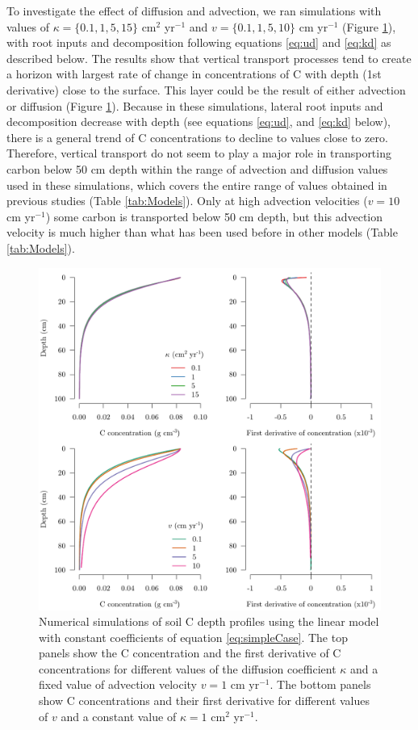 \documentclass[11pt, oneside, a4paper]{article}   	%
\begin{document}
To investigate the effect of diffusion and advection, we ran simulations with values of $\kappa = \{0.1, 1, 5, 15\}$ cm$^2$ yr$^{-1}$ and $v = \{0.1, 1, 5, 10 \}$ cm yr$^{-1}$  (Figure \ref{fig:AdvectionDiffusion}), with root inputs and decomposition following equations \ref{eq:ud} and \ref{eq:kd} as described below. The results show that vertical transport processes tend to create a horizon with largest rate of change in concentrations of C with depth (1st derivative) close to the surface. This layer could be the result of either advection or diffusion (Figure \ref{fig:AdvectionDiffusion}). Because in these simulations, lateral root inputs and decomposition decrease with depth (see equations \ref{eq:ud}, and \ref{eq:kd} below), there is a general trend of C concentrations to decline to values close to zero. Therefore, vertical transport do not seem to play a major role in transporting carbon below 50 cm depth within the range of advection and diffusion values used in these simulations, which covers the entire range of values obtained in previous studies (Table \ref{tab:Models}). Only at high advection velocities ($v=10$ cm yr$^{-1}$) some carbon is transported below 50 cm depth, but this advection velocity is much higher than what has been used before in other models (Table \ref{tab:Models}).

\begin{figure}[htbp]
   \centering
   \includegraphics[width=\textwidth]{Figures/simulationsKappaV.pdf} %
   \caption{Numerical simulations of soil C depth profiles using the linear model with constant coefficients of equation \ref{eq:simpleCase}. The top panels show the C concentration and the first derivative of C concentrations for different values of the diffusion coefficient $\kappa$ and a fixed value of advection velocity $v = 1$ cm yr$^{-1}$. The bottom panels show C concentrations and their first derivative for different values of $v$ and a constant value of $\kappa = 1$ cm$^2$ yr$^{-1}$. }
   \label{fig:AdvectionDiffusion}
\end{figure}
\end{document}
